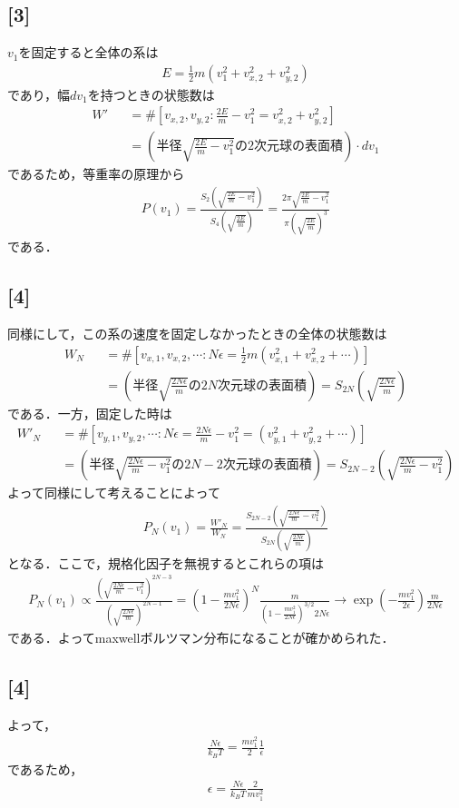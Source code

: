 \documentclass[12pt,dvipdfmx]{jsarticle}
\begin{document}
\subsection*{\large{[3]}}
$v_1$を固定すると全体の系は
\begin{eqnarray}
  E = \frac{1}{2}m \left( v_1^2 + v_{x,2}^2 + v_{y,2}^2 \right)
\end{eqnarray}
であり，幅$dv_1$を持つときの状態数は
\begin{eqnarray}
  W'  &&= \# \left[  v_{x,2},v_{y,2}: \frac{2E}{m}-v_1^2 = v_{x,2}^2 + v_{y,2}^2 \right]\\
  &&=\left( 半径\sqrt{ \frac{2E}{m}-v_1^2 }の2次元球の表面積 \right)\cdot dv_1
\end{eqnarray}
であるため，等重率の原理から
\begin{eqnarray}
  P(v_1) = \frac{S_2\left( \sqrt{ \frac{2E}{m}-v_1^2 } \right)}{S_4\left( \sqrt{\frac{2E}{m} } \right)}= \frac{2\pi \sqrt{ \frac{2E}{m}-v_1^2 } }{ \pi \left( \sqrt{\frac{2E}{m}} \right)^3 }
\end{eqnarray}
である．
\subsection*{\large{[4]}}
同様にして，この系の速度を固定しなかったときの全体の状態数は
\begin{eqnarray}
  W_{N} &&= \# \left[ v_{x,1},v_{x,2},\cdots: N\epsilon = \frac{1}{2}m \left( v_{x,1}^2 +v_{x,2}^2 + \cdots  \right) \right] \\
  &&= \left( 半径 \sqrt{\frac{2N\epsilon}{m}}の2N次元球の表面積 \right) = S_{2N}\left( \sqrt{\frac{2N\epsilon}{m}} \right)
\end{eqnarray}
である．一方，固定した時は
\begin{eqnarray}
  W'_{N} &&= \# \left[ v_{y,1},v_{y,2},\cdots: N\epsilon = \frac{2N\epsilon}{m}-v_1^2= \left( v_{y,1}^2 +v_{y,2}^2 + \cdots  \right) \right] \\
  &&= \left( 半径 \sqrt{\frac{2N\epsilon}{m}-v_1^2}の2N-2次元球の表面積 \right) = S_{2N-2}\left( \sqrt{\frac{2N\epsilon}{m}-v_1^2} \right)
\end{eqnarray}
よって同様にして考えることによって
\begin{eqnarray}
  P_N(v_1) = \frac{W'_{N}}{W_{N}}= \frac{S_{2N-2}\left( \sqrt{\frac{2N\epsilon}{m}-v_1^2} \right)}{S_{2N}\left( \sqrt{\frac{2N\epsilon}{m}} \right)}
\end{eqnarray}
となる．ここで，規格化因子を無視するとこれらの項は
\begin{eqnarray}
  P_N(v_1) \propto \frac{\left( \sqrt{\frac{2N\epsilon}{m}-v_1^2} \right)^{2N-3}}{\left( \sqrt{\frac{2N\epsilon}{m}} \right)^{2N-1}} = \left( 1- \frac{mv_1^2}{2N\epsilon} \right)^N \frac{m}{\left( 1-\frac{mv_1^2}{2N\epsilon} \right)^{3/2}2N\epsilon}\to \exp\left( -\frac{mv_1^2}{2\epsilon} \right)\frac{m}{2N\epsilon}
\end{eqnarray} 
である．よってmaxwellボルツマン分布になることが確かめられた．
\subsection*{\large{[4]}}
よって，
\begin{eqnarray}
  \frac{N\epsilon}{k_B T} = \frac{mv_1^2}{2}\frac{1}{\epsilon}
\end{eqnarray}
であるため，
\begin{eqnarray}
  \epsilon = \frac{N\epsilon}{k_B T} \frac{2}{mv_1^2}
\end{eqnarray}
\end{document}
